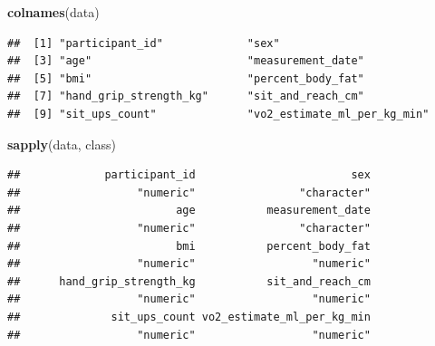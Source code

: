 \documentclass[
]{article}
\newenvironment{Shaded}{\begin{snugshade}}{\end{snugshade}}
\newcommand{\ControlFlowTok}[1]{\textcolor[rgb]{0.13,0.29,0.53}{\textbf{#1}}}
\newcommand{\FunctionTok}[1]{\textcolor[rgb]{0.13,0.29,0.53}{\textbf{#1}}}
\newcommand{\NormalTok}[1]{#1}
\newcommand{\OtherTok}[1]{\textcolor[rgb]{0.56,0.35,0.01}{#1}}
\newcommand{\SpecialCharTok}[1]{\textcolor[rgb]{0.81,0.36,0.00}{\textbf{#1}}}
\newcommand{\StringTok}[1]{\textcolor[rgb]{0.31,0.60,0.02}{#1}}
\begin{document}
\begin{Shaded}
\begin{Highlighting}[]
\FunctionTok{colnames}\NormalTok{(data)}
\end{Highlighting}
\end{Shaded}

\begin{verbatim}
##  [1] "participant_id"             "sex"                       
##  [3] "age"                        "measurement_date"          
##  [5] "bmi"                        "percent_body_fat"          
##  [7] "hand_grip_strength_kg"      "sit_and_reach_cm"          
##  [9] "sit_ups_count"              "vo2_estimate_ml_per_kg_min"
\end{verbatim}

\begin{Shaded}
\begin{Highlighting}[]
\FunctionTok{sapply}\NormalTok{(data, class)}
\end{Highlighting}
\end{Shaded}

\begin{verbatim}
##             participant_id                        sex 
##                  "numeric"                "character" 
##                        age           measurement_date 
##                  "numeric"                "character" 
##                        bmi           percent_body_fat 
##                  "numeric"                  "numeric" 
##      hand_grip_strength_kg           sit_and_reach_cm 
##                  "numeric"                  "numeric" 
##              sit_ups_count vo2_estimate_ml_per_kg_min 
##                  "numeric"                  "numeric"
\end{verbatim}

\begin{Shaded}
\end{Shaded}
\end{document}
